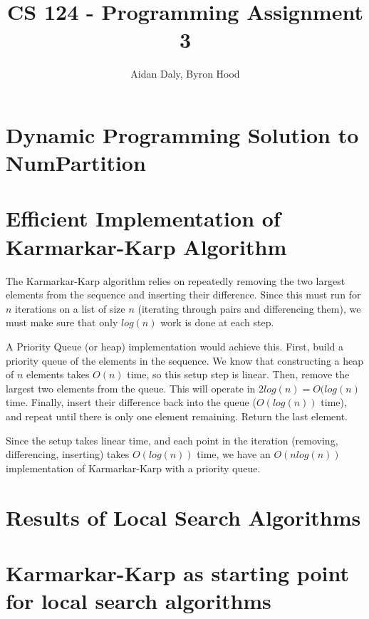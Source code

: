 \documentclass[11pt]{article}
\title{CS 124 - Programming Assignment 3}
\author{Aidan Daly, Byron Hood}
\begin{document}
\maketitle

\section{Dynamic Programming Solution to NumPartition}

\section{Efficient Implementation of Karmarkar-Karp Algorithm}
The Karmarkar-Karp algorithm relies on repeatedly removing the two largest elements from the sequence and inserting their difference.  Since this must run for $n$ iterations on a list of size $n$ (iterating through pairs and differencing them), we must make sure that only $log(n)$ work is done at each step.

A Priority Queue (or heap) implementation would achieve this.  First, build a priority queue of the elements in the sequence.  We know that constructing a heap of $n$ elements takes $O(n)$ time, so this setup step is linear.  Then, remove the largest two elements from the queue.  This will operate in $2log(n) = O(log(n)$ time.  Finally, insert their difference back into the queue ($O(log(n))$ time), and repeat until there is only one element remaining.  Return the last element. 

Since the setup takes linear time, and each point in the iteration (removing, differencing, inserting) takes $O(log(n))$ time, we have an $O(nlog(n))$ implementation of Karmarkar-Karp with a priority queue.

\section{Results of Local Search Algorithms}

\section{Karmarkar-Karp as starting point for local search algorithms}
\end{document}

